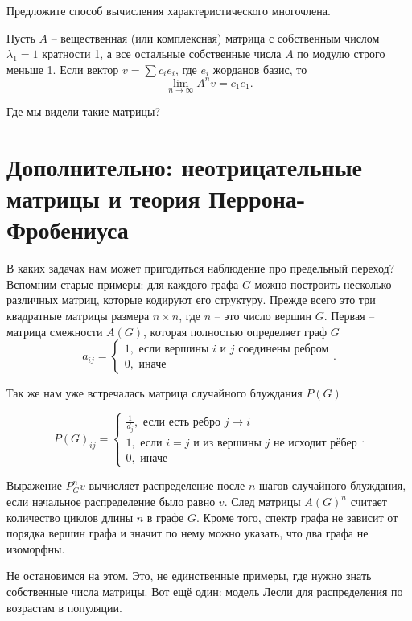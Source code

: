 \upr Предложите способ вычисления характеристического многочлена. 
\eupr


\utv Пусть $A$ -- вещественная (или комплексная) матрица с собственным числом $\lambda_1=1$ кратности 1, а все остальные собственные числа $A$ по модулю строго меньше 1. Если вектор $v= \sum c_i e_i$, где $e_i$ жорданов базис, то $$\lim_{n \to \infty}A^nv= c_1 e_1.$$
\eutv

Где мы видели такие матрицы?


\section{Дополнительно: неотрицательные матрицы и теория Перрона-Фробениуса}
\dfn

В каких задачах нам может пригодиться наблюдение про предельный переход? Вспомним старые примеры: для каждого графа $G$ можно построить  несколько  различных матриц, которые кодируют его структуру. Прежде всего это три квадратные матрицы  размера $n\times n$, где $n$ -- это число вершин $G$. 
Первая -- матрица смежности  $A(G)$, которая полностью определяет граф $G$
$$a_{ij}=\begin{cases} 1, \text{ если вершины $i$ и $j$ соединены ребром}\\
0, \text{ иначе }
\end{cases}.$$

Так же нам уже встречалась матрица случайного блуждания  $P(G)$

$$P(G)_{ij}=\begin{cases}
\frac{1}{d_j}, \text{ если есть ребро $j\to i$}\\
1, \text{ если $i=j$ и из вершины $j$ не исходит рёбер} \\
0, \text{ иначе }
\end{cases}.$$
\edfn

Выражение  $P_G^n v$ вычисляет распределение после $n$ шагов случайного блуждания, если начальное распределение было равно $v$. След матрицы $A(G)^n$ считает количество циклов длины $n$ в графе $G$. Кроме того, спектр графа не зависит от порядка вершин графа и значит по нему можно указать, что два графа не изоморфны.

Не остановимся на этом. Это, не единственные примеры, где нужно знать собственные числа матрицы. Вот ещё один: модель Лесли для распределения по возрастам в популяции.

